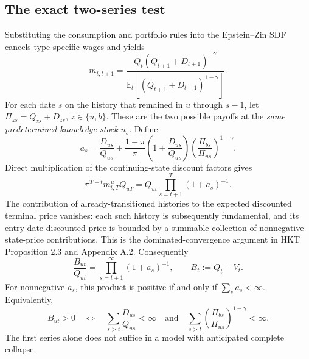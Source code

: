 \documentclass[11pt,a4paper]{article}
\newcommand{\E}{\mathbb E}
\begin{document}
\subsection{The exact two-series test}
Substituting the consumption and portfolio rules into the Epstein--Zin SDF
cancels type-specific wages and yields
\begin{equation}
m_{t,t+1}=\frac{Q_t(Q_{t+1}+D_{t+1})^{-\gamma}}
 {\E_t[(Q_{t+1}+D_{t+1})^{1-\gamma}]}.\label{eq:sdf}
\end{equation}
For each date $s$ on the history that remained in $u$ through $s-1$, let
$\Pi_{zs}=Q_{zs}+D_{zs}$, $z\in\{u,b\}$. These are the two possible
payoffs at the \emph{same predetermined knowledge stock} $n_s$.
Define
\begin{equation}
a_s=\frac{D_{us}}{Q_{us}}+
\frac{1-\pi}{\pi}\left(1+\frac{D_{us}}{Q_{us}}\right)
\left(\frac{\Pi_{bs}}{\Pi_{us}}\right)^{1-\gamma}.\label{eq:as}
\end{equation}
Direct multiplication of the continuing-state discount factors gives
\begin{equation}
\pi^{T-t}m^{u}_{t,T}Q_{uT}
=Q_{ut}\prod_{s=t+1}^{T}(1+a_s)^{-1}.\label{eq:product}
\end{equation}
The contribution of already-transitioned histories to the expected discounted
terminal price vanishes: each such history is subsequently fundamental, and
its entry-date discounted price is bounded by a summable collection of
nonnegative state-price contributions. This is the dominated-convergence
argument in HKT Proposition 2.3 and Appendix A.2. Consequently
\begin{equation}
\boxed{\frac{B_{ut}}{Q_{ut}}=
\prod_{s=t+1}^{\infty}(1+a_s)^{-1},\qquad B_t:=Q_t-V_t.}\label{eq:bubblefraction}
\end{equation}
For nonnegative $a_s$, this product is positive if and only if
$\sum_s a_s<\infty$. Equivalently,
\begin{equation}
\boxed{B_{ut}>0\quad\Longleftrightarrow\quad
\sum_{s>t}\frac{D_{us}}{Q_{us}}<\infty
\quad\text{and}\quad
\sum_{s>t}\left(\frac{\Pi_{bs}}{\Pi_{us}}\right)^{1-\gamma}<\infty.}
\label{eq:two-series}
\end{equation}
The first series alone does not suffice in a model with anticipated complete
collapse.
\end{document}
